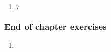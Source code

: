 {\begin{multicols}{3}
\begin{enumerate}[label=\textbf{\arabic*}.,itemsep=1pt]
\begin{enumerate}[label=\textbf{(\alph*)}, itemsep=1pt]
\item $0$%
\item $-\frac{5}{2}$%
\item $-7$%
\item $\frac{5}{9}$%
\item $4$%
\item $-\frac{1}{2}$%
\item $-\frac{4}{5}$%
\item $3$%
\item $1$%
\item $\frac{3}{2}$ or $0$%
\item $1$%

\end{enumerate}

 \item $7$%
\end{enumerate}

\subsubsection*{End of chapter exercises} %

\begin{enumerate}[label=\textbf{\arabic*}., noitemsep]
\item %


\end{enumerate}
\end{multicols}}
